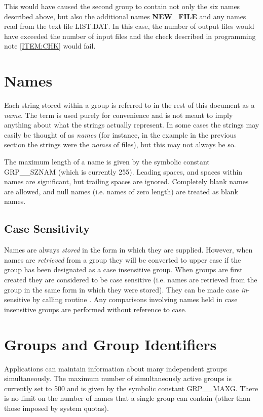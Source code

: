 This would have caused the second group to contain not only the six names
described above, but also the additional names {\bf NEW\_FILE} and any names
read from the text file LIST.DAT. In this case, the number of output files would
have exceeded the number of input files and the check described in programming
note \ref{ITEM:CHK} would fail.

\section{Names}

Each string stored within a group is referred to in the rest of this document as
a {\em name}. The term is used purely for convenience and is not meant to imply
anything about what the strings actually represent. In some cases the strings
may easily be thought of as {\em names} (for instance, in the example
in the previous section the strings were the {\em names} of
files), but this may not always be so.

The maximum length of a name is given by the symbolic constant GRP\_\_SZNAM
(which is currently 255). Leading spaces, and spaces within names are
significant, but trailing spaces are ignored. Completely blank names are
allowed, and null names (i.e. names of zero length) are treated as blank names.

\subsection{\label{SEC:CASE}Case Sensitivity}
Names are always {\em stored} in the form in which they are supplied. However,
when names are {\em retrieved} from a group they will be converted to upper case
if the group has been designated as a case insensitive group. When groups are
first created they are considered to be case sensitive (i.e. names are retrieved
from the group in the same form in which they were stored). They can be made
case {\em in}-sensitive by calling routine . Any comparisons involving
names held in case insensitive groups are performed without reference to case.

\section{Groups and Group Identifiers}

Applications can maintain information about many independent groups
simultaneously. The maximum number of simultaneously active groups is currently
set to 500 and is given by the symbolic constant GRP\_\_MAXG. There is no
limit on the number of names that a single group can contain (other than those
imposed by system quotas).

